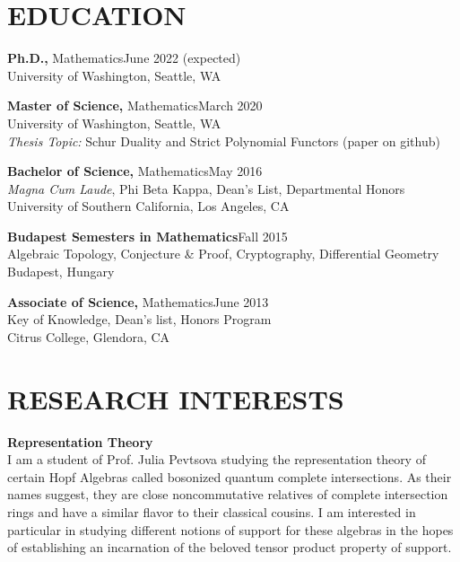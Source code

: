 \documentclass[margin]{res} %
\begin{document}
\begin{resume}



\section{EDUCATION}

{\bf Ph.D.,} Mathematics\hfill June 2022 (expected) \\
University of Washington, Seattle, WA

{\bf Master of Science,} Mathematics\hfill March 2020 \\
University of Washington, Seattle, WA \\
{\it Thesis Topic:} Schur Duality and Strict Polynomial Functors (paper on github)

{\bf Bachelor of Science,} Mathematics\hfill May 2016 \\
{\sl Magna Cum Laude}, Phi Beta Kappa, Dean's List, Departmental Honors \\
University of Southern California, Los Angeles, CA 

{\bf Budapest Semesters in Mathematics}\hfill Fall 2015 \\
Algebraic Topology, Conjecture \& Proof, Cryptography, Differential Geometry  \\
Budapest, Hungary 

{\bf Associate of Science,} Mathematics\hfill June 2013\\
Key of Knowledge, Dean's list, Honors Program \\
Citrus College, Glendora, CA 
 

\section{RESEARCH INTERESTS}

\textbf{Representation Theory}\\
I am a student of Prof. Julia Pevtsova studying the representation theory of certain Hopf Algebras
called bosonized quantum complete intersections. As their names suggest, they are close noncommutative
relatives of complete intersection rings and have a similar flavor to their classical cousins. I am interested 
in particular in studying different notions of support for these algebras in the hopes of establishing
an incarnation of the beloved tensor product property of support.


\end{resume}
\end{document}
